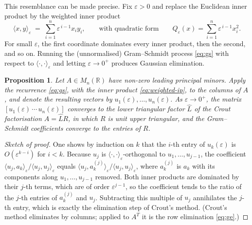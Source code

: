 \documentclass[12pt, a4paper]{report}
\theoremstyle{plain}
\newtheorem{proposition}[theorem]{Proposition}
\theoremstyle{definition}
\theoremstyle{remark}
\theoremstyle{plain}
\newcommand{\RR}{\mathbb{R}}
\begin{document}
This resemblance can be made precise. Fix $\varepsilon>0$ and replace the Euclidean inner product by the weighted inner product
\begin{equation}\label{eq:weighted-ip}
  \langle x, y\rangle_\varepsilon \;=\; \sum_{i=1}^{n} \varepsilon^{\,i-1} x_i y_i ,
  \qquad\text{with quadratic form}\qquad Q_\varepsilon(x)=\sum_{i=1}^n \varepsilon^{\,i-1}x_i^2 .
\end{equation}
For small $\varepsilon$, the first coordinate dominates every inner product, then the second, and so on. Running the (unnormalised) Gram--Schmidt process \eqref{eq:gs} with respect to $\langle\cdot,\cdot\rangle_\varepsilon$ and letting $\varepsilon\to 0^+$ produces Gaussian elimination.

\begin{proposition}\label{prop:gs-limit}
Let $A\in M_n(\RR)$ have non-zero leading principal minors. Apply the recurrence \eqref{eq:gs}, with the inner product \eqref{eq:weighted-ip}, to the columns of $A$, and denote the resulting vectors by $u_1(\varepsilon),\dots,u_n(\varepsilon)$. As $\varepsilon\to 0^+$, the matrix $[u_1(\varepsilon)\,\cdots\,u_n(\varepsilon)]$ converges to the lower triangular factor $\hat L$ of the Crout factorisation $A=\hat L R$, in which $R$ is unit upper triangular, and the Gram--Schmidt coefficients converge to the entries of $R$.
\end{proposition}
\begin{proof}[Sketch of proof]
One shows by induction on $k$ that the $i$-th entry of $u_k(\varepsilon)$ is $O(\varepsilon^{k-i})$ for $i<k$. Because $u_j$ is $\langle\cdot,\cdot\rangle_\varepsilon$-orthogonal to $u_1,\dots,u_{j-1}$, the coefficient $\langle u_j,a_k\rangle_\varepsilon/\langle u_j,u_j\rangle_\varepsilon$ equals $\langle u_j,a_k^{(j)}\rangle_\varepsilon/\langle u_j,u_j\rangle_\varepsilon$, where $a_k^{(j)}$ is $a_k$ with its components along $u_1,\dots,u_{j-1}$ removed. Both inner products are dominated by their $j$-th terms, which are of order $\varepsilon^{j-1}$, so the coefficient tends to the ratio of the $j$-th entries of $a_k^{(j)}$ and $u_j$. Subtracting this multiple of $u_j$ annihilates the $j$-th entry, which is exactly the elimination step of Crout's method. (Crout's method eliminates by columns; applied to $A^T$ it is the row elimination \eqref{eq:ge}.)
\end{proof}
\end{document}
